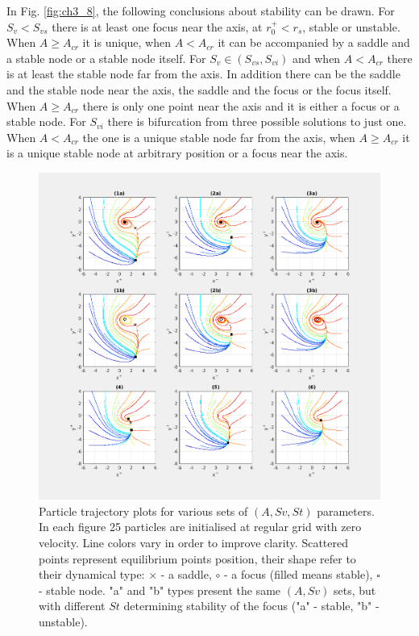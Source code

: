 \documentclass[../main.tex]{subfiles}
\begin{document}
In Fig. \ref{fig:ch3_8}, the following conclusions about stability can be drawn.  For $S_v<S_{v s}$ there is at least one focus near the axis, at $r^+_0<r_s$, stable or unstable. When $A \geq A_{cr}$ it is unique, when $A<A_{cr}$ it can be accompanied by a saddle and a stable node or a stable node itself. For $S_v \in (S_{v s},S_{v i})$ and when $A<A_{cr}$ there is at least the stable node far from the axis. In addition there can be the saddle and the stable node near the axis, the saddle and the focus or the focus itself. When $A \geq A_{cr}$ there is only one point near the axis and it is either a focus or a stable node. For $S_{v i}$ there is bifurcation from three possible solutions to just one. When $A<A_{cr}$ the one is a unique stable node far from the axis, when $A \geq A_{cr}$ it is a unique stable node at arbitrary position or a focus near the axis.\\

\begin{figure}
\centering
\noindent \includegraphics[width=30pc]{gfx/scenarios_9p_T500_D5_N5.png}
\caption{Particle trajectory plots for various sets of $(A,Sv,St)$ parameters. In each figure 25 particles are initialised at regular grid with zero velocity. Line colors vary in order to improve clarity. Scattered points represent equilibrium points position, their shape refer to their dynamical type: $\times$ - a saddle, $\circ$ - a focus (filled means stable), $\square$ - stable node. "a" and "b" types present the same $(A,Sv)$ sets, but with different $St$ determining stability of the focus ("a" - stable, "b" - unstable).}
\label{fig:ch3_9}
\end{figure}
\end{document}
